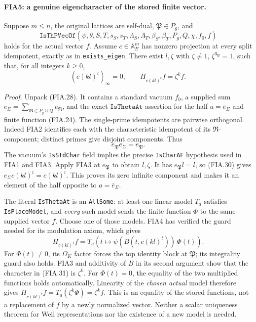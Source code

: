 \paragraph{FIA5: a genuine eigencharacter of the stored finite vector.}
\label{claim:FIA5}
Suppose \(m\le n\), the original lattices are self-dual,
\(\mathfrak P\in P_g\), and
\[
 \texttt{IsThPVecOf}
   (\psi,\theta,S,T,s_S,s_T,\Lambda_S,\Lambda_T,
         \beta_S,\beta_T,P_g,Q,\chi,f_0,f)
 \tag{FIA.28}
\]
holds for the actual vector \(f\).
Assume \(c\in\mathbb A_E^m\) has nonzero projection at every
split idempotent, exactly as in \texttt{exists\_eigen}.
There exist \(l,\zeta\) with \(\zeta\ne1\),
\(\zeta^{q_{\mathfrak P}}=1\), such that, for all integers
\(k\ge0\),
\[
        (c(kl)^t)_\infty=0,\qquad
        H_{c(kl)^t}f=\zeta^k f .
 \tag{FIA.29}
\]

\emph{Proof.}
Unpack (FIA.28).  It contains a standard vacuum \(f_0\),
a supplied sum \(e_\Sigma=\sum_{\mathfrak R\in P_g\cup Q}
e_{\mathfrak R}\), and the exact
\(\texttt{IsThetaAt}\) assertion for the half \(a=\bar e_\Sigma\)
and finite function (FIA.24).
The single-prime idempotents are pairwise orthogonal.
Indeed FIA2 identifies each with the characteristic idempotent
of its \(\mathfrak R\)-component; distinct primes give disjoint
components.  Thus
\[
            e_{\mathfrak P}e_\Sigma=e_{\mathfrak P}.
 \tag{FIA.30}
\]
The vacuum's \texttt{IsStdChar} field implies the precise
\texttt{IsCharAF} hypothesis used in FIA1 and FIA3.
Apply FIA3 at \(e_{\mathfrak P}\) to obtain \(l,\zeta\).
It has \(e_{\mathfrak P}l=l\), so (FIA.30) gives
\(e_\Sigma c(kl)^t=c(kl)^t\).  This proves its zero
infinite component and makes it an element of the half
opposite to \(a=\bar e_\Sigma\).

The literal \texttt{IsThetaAt} is an \texttt{AllSome}:
at least one linear model \(T_a\) satisfies
\texttt{IsPlaceModel}, and \emph{every} such model sends
the finite function \(\Phi\) to the same supplied vector \(f\).
Choose one of those models.  FIA4 has verified the guard
needed for its modulation axiom, which gives
\[
 H_{c(kl)^t}f
   =T_a\!\left(t\longmapsto
           \psi(B(t,c(kl)^t))\,\Phi(t)\right).
 \tag{FIA.31}
\]
For \(\Phi(t)\ne0\), its \(\Omega_K\) factor forces the
top identity block at \(\mathfrak P\); its integrality guard
also holds.  FIA3 and additivity of \(B\) in its second
argument show that the character in (FIA.31) is \(\zeta^k\).
For \(\Phi(t)=0\), the equality of the two multiplied
functions holds automatically.  Linearity of the
\emph{chosen actual} model therefore gives
\(H_{c(kl)^t}f=T_a(\zeta^k\Phi)=\zeta^k f\).
This is an equality of the stored functions, not a replacement
of \(f\) by a newly normalized vector.  Neither a scalar
uniqueness theorem for Weil representations nor the existence
of a new model is needed.


